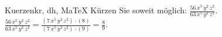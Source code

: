 \begin{MAufgabe}{Kuerzen}{kr, dh, MaTeX}
K\"urzen Sie soweit m\"oglich: $\frac{56\, x^5\, y^2\, z^2}{63\, x^5\, y^2\, z^2}$.\\ 
\ifLsg\MLoesung
\quad $\frac{56\, x^5\, y^2\, z^2}{63\, x^5\, y^2\, z^2}=\frac{(7\, x^5\, y^2\, z^2)\cdot(8)}{(7\, x^5\, y^2\, z^2)\cdot(9)}=\frac{8}{9}$.\else\relax\fi
 \end{MAufgabe}